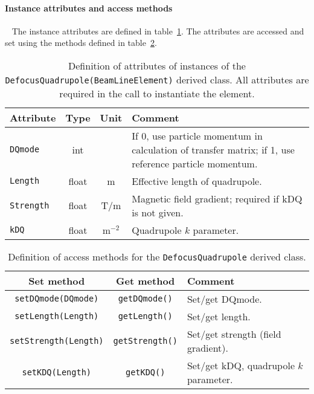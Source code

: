 \paragraph{Instance attributes and access methods} ~\newline
\label{SubSubSect:DQuad:InstAttr}
\noindent
The instance attributes are defined in
table~\ref{Tab:DQuad:Attributes}. 
The attributes are accessed and set using the methods defined in
table~\ref{Tab:DQuad:Methods}.
\begin{table}[h]
  \caption{
    Definition of attributes of instances of
    the \texttt{DefocusQuadrupole(BeamLineElement)} derived class.
    All attributes are required in the call to instantiate the
    element.
  }
  \label{Tab:DQuad:Attributes}
  \begin{center}
    \begin{tabular}{|l|c|c|p{10cm}|}
      \hline
      \textbf{Attribute}   & \textbf{Type} & \textbf{Unit} & \textbf{Comment}                    \\
      \hline
      \texttt{DQmode}   & int   &       & If 0, use particle momentum in calculation of transfer
                                          matrix; if 1, use reference particle momentum.         \\
      \texttt{Length}   & float & m     & Effective length of quadrupole.                        \\
      \texttt{Strength} & float & T/m   & Magnetic field gradient; required if kDQ is not given. \\
      \texttt{kDQ}      & float & m$^{-2}$ & Quadrupole $k$ parameter.                               \\
      \hline
    \end{tabular}
  \end{center}
\end{table}
\begin{table}[h]
  \caption{
    Definition of access methods for the \texttt{DefocusQuadrupole} derived
    class. 
  }
  \label{Tab:DQuad:Methods}
  \begin{center}
    \begin{tabular}{|c|c|p{7cm}|}
      \hline
      \textbf{Set method} & \textbf{Get method}  & \textbf{Comment}                                    \\
      \hline
      \texttt{setDQmode(DQmode)}   & \texttt{getDQmode()}   & Set/get DQmode.                        \\
      \texttt{setLength(Length)}   & \texttt{getLength()}   & Set/get length.                        \\
      \texttt{setStrength(Length)} & \texttt{getStrength()} & Set/get strength (field gradient).     \\
      \texttt{setKDQ(Length)}      & \texttt{getKDQ()}      & Set/get kDQ, quadrupole $k$ parameter. \\
      \hline
    \end{tabular}
  \end{center}
\end{table}

